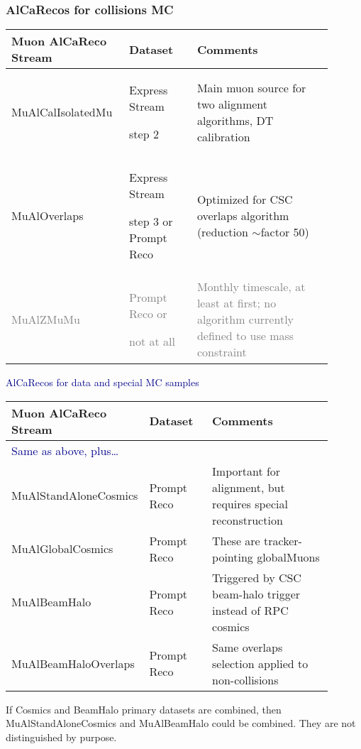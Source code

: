 \documentclass[compress]{beamer}
\begin{document}
\begin{frame}
\frametitle{AlCaRecos for collisions MC}
\scriptsize
\renewcommand{\arraystretch}{1.2}

\begin{tabular}{p{0.3\linewidth} p{0.2\linewidth} p{0.4\linewidth}}
Muon AlCaReco Stream & Dataset & Comments \\\hline
MuAlCalIsolatedMu & Express Stream

step 2 & Main muon source for two alignment algorithms, DT calibration \\
MuAlOverlaps & Express Stream

step 3 or Prompt Reco & Optimized for CSC overlaps algorithm (reduction $\sim$factor 50) \\
\textcolor{gray}{MuAlZMuMu} & \textcolor{gray}{Prompt Reco or}

\textcolor{gray}{not at all} & \textcolor{gray}{Monthly timescale, at least at first; no algorithm currently defined to use mass constraint} \\
\end{tabular}

\vfill
\hspace{-0.83 cm} \textcolor{darkblue}{\Large AlCaRecos for data and special MC samples}

\begin{tabular}{p{0.3\linewidth} p{0.2\linewidth} p{0.4\linewidth}}
Muon AlCaReco Stream & Dataset & Comments \\\hline
\textcolor{darkblue}{Same as above, plus\ldots} & & \\
MuAlStandAloneCosmics & Prompt Reco & Important for alignment, but requires special reconstruction \\
MuAlGlobalCosmics & Prompt Reco & These are tracker-pointing globalMuons \\
MuAlBeamHalo & Prompt Reco & Triggered by CSC beam-halo trigger instead of RPC cosmics \\
MuAlBeamHaloOverlaps & Prompt Reco & Same overlaps selection applied to non-collisions \\
\end{tabular}

\vfill
If Cosmics and BeamHalo primary datasets are combined, then \mbox{MuAlStandAloneCosmics\hspace{-0.5 cm}} and MuAlBeamHalo could be combined.  They are not distinguished by purpose.

\label{numpages}
\end{frame}
\end{document}
